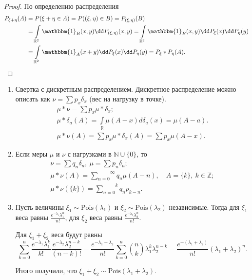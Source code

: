      \begin{proof}
        По определению распределения
        \begin{align*}
            P_{\xi + \eta}(A) &= P(\xi + \eta \in A) = P((\xi, \eta) \in B) = P_{(\xi, \eta)}(B) \\&=\int\limits_{\mathbb{R}^2}\mathbbm{1}_B (x, y) \dd P_{(\xi, \eta)}(x, y) = \int\limits_{\mathbb{R}^2}\mathbbm{1}_B(x, y)\dd P_{\xi}(x) \dd P_\eta(y) \\&=\int\limits_{\mathbb{R}^2}\mathbbm{1}_A(x + y)\dd P_{\xi}(x) \dd P_\eta(y) = P_\xi * P_\eta (A).
        \end{align*}
        
     \end{proof}

     \begin{examples}
\enewline
         \begin{enumerate}
             \item Свертка с дискретным распределением. Дискретное распределение можно описать как  $\nu = \sum p_x \delta_x$ (вес на нагрузку в точке).
            \begin{gather*}
                \mu*\nu = \sum p_x\mu*\delta_x;\\
                \mu*\delta_a(A) = \int\limits_\mathbb{R}\mu(A- x)d\delta_a(x) = \mu(A-a).\\
                \mu*\nu(A) = \sum p_x\mu*\delta_x(A) = \sum p_x\mu(A-x).
            \end{gather*}

             \item Если меры $\mu$ и $\nu$ с нагрузками в $\mathbb{N}\cup \{0\}$, то
    \begin{gather*}
        \nu = \sum q_n\delta_n, \ \mu = \sum p_n\delta_n;\\
        \mu*\nu(A) = \overset{\infty}{\underset{n = 0}{\sum}} q_n\mu(A-n), \quad A = \{k\}, \ k\in\mathbb{Z}; \\
        \mu*\nu(\{k\}) = \overset{k}{\underset{n = 0}{\sum}}q_np_{k - n}.
    \end{gather*}
         

             \item Пусть величины $\xi_1 \sim \text{Pois}(\lambda_1)$ и $\xi_2 \sim \text{Pois}(\lambda_2)$ независимые. Тогда
                   для $\xi_1$ веса равны $\frac{e^{-\lambda_1}\lambda_1^n}{n!}$, для $\xi_2$ веса равны $\frac{e^{-\lambda_2}\lambda_2^n}{n!}$.

                   Для $\xi_1+ \xi_2$ веса будут равны $$\overset{n}{\underset{k = 0}{\sum}}\frac{e^{-\lambda_1}\lambda_1^k}{k!}\frac{e^{-\lambda_2}\lambda_2^{n - k}}{(n - k)!} = \frac{e^{-\lambda_1 - \lambda_2}}{n!}\overset{n}{\underset{k = 0}{\sum}}\binom{n}{k} \lambda_1^k\lambda_2^{n - k} = \frac{e^{-(\lambda_1+\lambda_2)}}{n!}(\lambda_1+\lambda_2)^n.$$

                   Итого получили, что $\xi_1+\xi_2\sim \text{Pois}(\lambda_1+\lambda_2)$.
         \end{enumerate}
     \end{examples}
